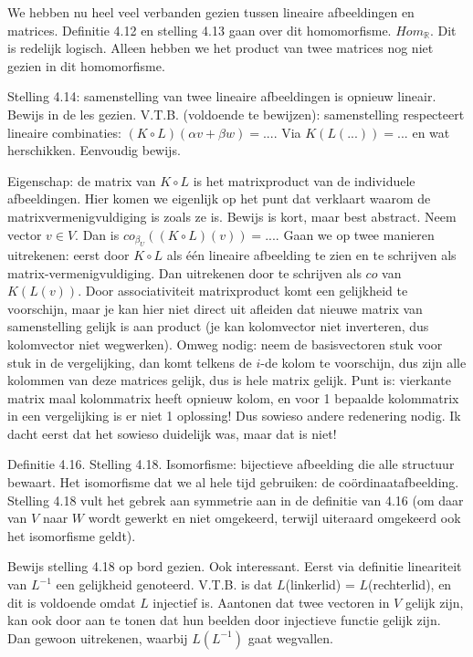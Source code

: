 \documentclass{article}
\begin{document}
We hebben nu heel veel verbanden gezien tussen lineaire afbeeldingen en matrices. Definitie 4.12 en stelling 4.13 gaan over dit homomorfisme. $Hom_{\mathbb{R}}$. Dit is redelijk logisch. Alleen hebben we het product van twee matrices nog niet gezien in dit homomorfisme. 

Stelling 4.14: samenstelling van twee lineaire afbeeldingen is opnieuw lineair. Bewijs in de les gezien. 
V.T.B. (voldoende te bewijzen): samenstelling respecteert lineaire combinaties: $(K \circ L) (\alpha v + \beta w) =...$. Via $K(L(...))=...$ en wat herschikken. Eenvoudig bewijs. 

Eigenschap: de matrix van $K \circ L$ is het matrixproduct van de individuele afbeeldingen. Hier komen we eigenlijk op het punt dat verklaart waarom de matrixvermenigvuldiging is zoals ze is. Bewijs is kort, maar best abstract. Neem vector $v \in V$. Dan is $co_{\beta_U}( (K \circ L) (v) ) =... $. Gaan we op twee manieren uitrekenen: eerst door $K \circ L$ als \'e\'en lineaire afbeelding te zien en te schrijven als matrix-vermenigvuldiging. Dan uitrekenen door te schrijven als $co$ van $K (L(v))$. Door associativiteit matrixproduct komt een gelijkheid te voorschijn, maar je kan hier niet direct uit afleiden dat nieuwe matrix van samenstelling gelijk is aan product (je kan kolomvector niet inverteren, dus kolomvector niet wegwerken). Omweg nodig: neem de basisvectoren stuk voor stuk in de vergelijking, dan komt telkens de $i$-de kolom te voorschijn, dus zijn alle kolommen van deze matrices gelijk, dus is hele matrix gelijk. Punt is: vierkante matrix maal kolommatrix heeft opnieuw kolom, en voor 1 bepaalde kolommatrix in een vergelijking is er niet 1 oplossing! Dus sowieso andere redenering nodig. Ik dacht eerst dat het sowieso duidelijk was, maar dat is niet! 

Definitie 4.16. Stelling 4.18. Isomorfisme: bijectieve afbeelding die alle structuur bewaart. Het isomorfisme dat we al hele tijd gebruiken: de co\"ordinaatafbeelding. Stelling 4.18 vult het gebrek aan symmetrie aan in de definitie van 4.16 (om daar van $V$ naar $W$ wordt gewerkt en niet omgekeerd, terwijl uiteraard omgekeerd ook het isomorfisme geldt). 

Bewijs stelling 4.18 op bord gezien. Ook interessant. Eerst via definitie lineariteit van $L^{-1}$ een gelijkheid genoteerd.  V.T.B. is dat $L$(linkerlid) = $L$(rechterlid), en dit is voldoende omdat $L$ injectief is. Aantonen dat twee vectoren in $V$ gelijk zijn, kan ook door aan te tonen dat hun beelden door injectieve functie gelijk zijn. Dan gewoon uitrekenen, waarbij $L(L^{-1})$ gaat wegvallen. 
\end{document}
